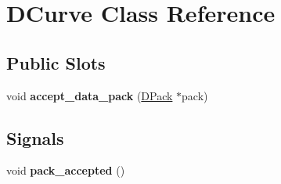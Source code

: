 \hypertarget{class_d_curve}{
\section{DCurve Class Reference}
\label{class_d_curve}
}
\subsection*{Public Slots}
\begin{DoxyCompactItemize}
\item 
\hypertarget{class_d_curve_abf43db485286d4960afb1117d1b4fdb1}{
void {\bfseries accept\_\-data\_\-pack} (\hyperlink{struct_d_pack}{DPack} $\ast$pack)}
\label{class_d_curve_abf43db485286d4960afb1117d1b4fdb1}

\end{DoxyCompactItemize}
\subsection*{Signals}
\begin{DoxyCompactItemize}
\item 
\hypertarget{class_d_curve_aa6b8a386846b76a76fbcbc44e5830ee9}{
void {\bfseries pack\_\-accepted} ()}
\label{class_d_curve_aa6b8a386846b76a76fbcbc44e5830ee9}

\end{DoxyCompactItemize}
